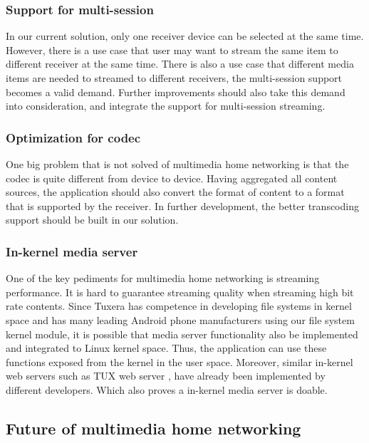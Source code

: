 \subsubsection{Support for multi-session}
In our current solution, only one receiver device can be selected at the same time. However, there is a use case that user may want to stream the same item to different receiver at the same time. There is also a use case that different media items are needed to streamed to different receivers, the multi-session support becomes a valid demand. Further improvements should also take this demand into consideration, and integrate the support for multi-session streaming.
\subsubsection{Optimization for codec}
One big problem that is not solved of multimedia home networking is that the codec is quite different from device to device. Having aggregated all content sources, the application should also convert the format of content to a format that is supported by the receiver. In further development, the better transcoding support should be built in our solution.
\subsubsection{In-kernel media server}
One of the key pediments for multimedia home networking is streaming performance. It is hard to guarantee streaming quality when streaming high bit rate contents. Since Tuxera has competence in developing file systems in kernel space and has many leading Android phone manufacturers using our file system kernel module, it is possible that media server functionality also be implemented and integrated to Linux kernel space. Thus, the application can use these functions exposed from the kernel in the user space.
Moreover, similar in-kernel web servers such as TUX web server \cite{tux_webserver}, have already been implemented by different developers. Which also proves a in-kernel media server is doable.
\subsection{Future of multimedia home networking}
